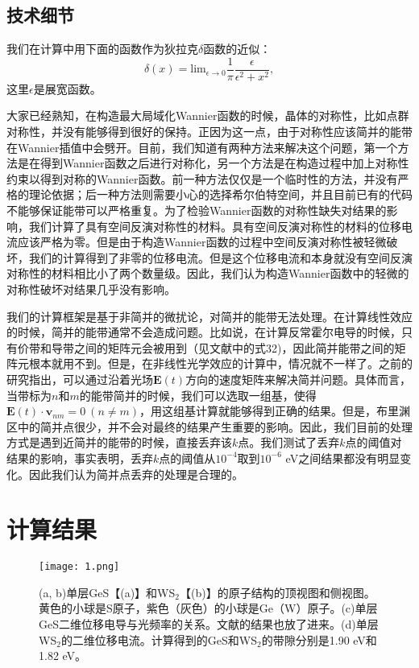 \subsection{技术细节}

我们在计算中用下面的函数作为狄拉克$\delta$函数的近似：
\[
\delta(x) = \text{lim}_{\epsilon\to0}\frac{1}{\pi}\frac{\epsilon}{\epsilon^{2}+x^{2}},
\]
这里$\epsilon$是展宽函数。

大家已经熟知，在构造最大局域化Wannier函数的时候，晶体的对称性，比如点群对称性，并没有能够得到很好的保持。正因为这一点，由于对称性应该简并的能带在Wannier插值中会劈开。目前，我们知道有两种方法来解决这个问题，第一个方法是在得到Wannier函数之后进行对称化，另一个方法是在构造过程中加上对称性约束以得到对称的Wannier函数。前一种方法仅仅是一个临时性的方法，并没有严格的理论依据；后一种方法则需要小心的选择希尔伯特空间，并且目前已有的代码不能够保证能带可以严格重复。为了检验Wannier函数的对称性缺失对结果的影响，我们计算了具有空间反演对称性的材料。具有空间反演对称性的材料的位移电流应该严格为零。但是由于构造Wannier函数的过程中空间反演对称性被轻微破坏，我们的计算得到了非零的位移电流。但是这个位移电流和本身就没有空间反演对称性的材料相比小了两个数量级。因此，我们认为构造Wannier函数中的轻微的对称性破坏对结果几乎没有影响。

我们的计算框架是基于非简并的微扰论，对简并的能带无法处理。在计算线性效应的时候，简并的能带通常不会造成问题。比如说，在计算反常霍尔电导的时候，只有价带和导带之间的矩阵元会被用到（见文献中的式32)，因此简并能带之间的矩阵元根本就用不到。但是，在非线性光学效应的计算中，情况就不一样了。之前的研究指出，可以通过沿着光场$\mathbf{E}(t)$方向的速度矩阵来解决简并问题。具体而言，当带标为$n$和$m$的能带简并的时候，我们可以选取一组基，使得$\mathbf{E}(t)\cdot\mathbf{v}_{nm}=0  \ (n\ne m)$\cite{sipe_second-order_2000}，用这组基计算就能够得到正确的结果。但是，布里渊区中的简并点很少，并不会对最终的结果产生重要的影响。因此，我们目前的处理方式是遇到近简并的能带的时候，直接丢弃该$k$点。我们测试了丢弃$k$点的阈值对结果的影响，事实表明，丢弃$k$点的阈值从$10^{-4}$取到$10^{-6}$ eV之间结果都没有明显变化。因此我们认为简并点丢弃的处理是合理的。

\section{计算结果}


\begin{figure}
	\begin{centering}
	\texttt{[image: 1.png]}
	\par\end{centering}
	\caption{\label{fig1} (a, b)单层GeS【(a)】和WS$_{2}$【(b)】的原子结构的顶视图和侧视图。黄色的小球是S原子，紫色（灰色）的小球是Ge（W）原子。(c)单层GeS二维位移电导与光频率的关系。文献的结果也放了进来。(d)单层WS$_2$的二维位移电流。计算得到的GeS和WS$_2$的带隙分别是1.90 eV和1.82 eV。}
\end{figure}

